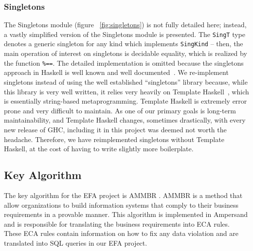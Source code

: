 \documentclass[12pt, svgnames]{article}
\let\Oldsubsection\subsection
\renewcommand{\subsection}{\FloatBarrier\Oldsubsection}
\let\Oldsubsubsection\subsubsection
\renewcommand{\subsubsection}{\FloatBarrier\Oldsubsubsection}
\begin{document}
\Oldsubsubsection{Singletons}

The Singletons module (figure ~\ref{fig:singletons}) is not fully detailed here;
instead, a vastly simplified version of the Singletons module is presented. The
\lstinline{SingT} type denotes a generic singleton for any kind which implements
\lstinline{SingKind} -- then, the main operation of interest on singletons is
decidable equality, which is realized by the function \lstinline{%==}. The
  detailed implementation is omitted because the singletons approach in Haskell
  is well known and well documented~\cite{singletons}. We re-implement
  singletons instead of using the well established ``singletons'' library
  because, while this library is very well written, it relies very heavily on
  Template Haskell~\cite{th}, which is essentially string-based
  metaprogramming. Template Haskell is extremely error prone and very difficult
  to maintain. As one of our primary goals is long-term maintainability, and
  Template Haskell changes, sometimes drastically, with every new release of
  GHC, including it in this project was deemed not worth the
  headache. Therefore, we have reimplemented singletons without Template
  Haskell, at the cost of having to write slightly more boilerplate.


\subsection{Key Algorithm}
The key algorithm for the EFA project is AMMBR \cite{AMMBR}. AMMBR is a method 
that allow organizations to build information systems that comply to their 
business requirements in a provable manner. This algorithm is implemented in 
Ampersand and is responsible for translating the business requirements into ECA 
rules. These ECA rules contain information on how to fix any data violation and 
are translated into SQL queries in our EFA project.
\end{document}
